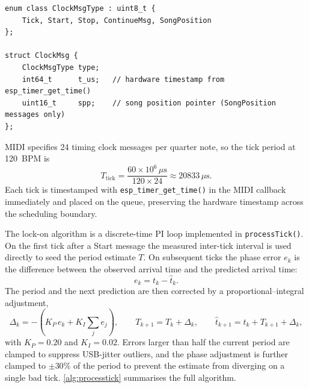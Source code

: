 \begin{listing}[H]
	\begin{verbatim}
enum class ClockMsgType : uint8_t {
    Tick, Start, Stop, ContinueMsg, SongPosition
};

struct ClockMsg {
    ClockMsgType type;
    int64_t      t_us;   // hardware timestamp from esp_timer_get_time()
    uint16_t     spp;    // song position pointer (SongPosition messages only)
};
\end{verbatim}
	\caption{\texttt{ClockMsg} type definitions from \texttt{clock\_sync.h}.}
	\label{lst:clockmsg}
\end{listing}

MIDI specifies 24 timing clock messages per quarter note, so the tick period at 120~BPM is
\begin{equation}
	T_\text{tick} = \frac{60 \times 10^6\,\mu\text{s}}{120 \times 24} \approx 20833\,\mu\text{s}.
\end{equation}
Each tick is timestamped with \texttt{esp\_timer\_get\_time()} in the MIDI callback immediately
and placed on the queue, preserving the hardware timestamp across the scheduling boundary.

The lock-on algorithm is a discrete-time PI loop implemented in \texttt{processTick()}.
On the first tick after a Start message the measured inter-tick interval is used directly
to seed the period estimate $T$.
On subsequent ticks the phase error $e_k$ is the difference between the observed arrival time
and the predicted arrival time:
\begin{equation}
	e_k = t_k - \hat{t}_k .
\end{equation}
The period and the next prediction are then corrected by a proportional--integral adjustment,
\begin{equation}
	\Delta_k = -\!\left(K_P \, e_k + K_I \textstyle\sum_j e_j\right), \qquad
	T_{k+1} = T_k + \Delta_k, \qquad
	\hat{t}_{k+1} = t_k + T_{k+1} + \Delta_k,
\end{equation}
with $K_P = 0.20$ and $K_I = 0.02$.
Errors larger than half the current period are clamped to suppress USB-jitter outliers,
and the phase adjustment is further clamped to $\pm 30\%$ of the period to prevent
the estimate from diverging on a single bad tick.
\autoref{alg:processtick} summarises the full algorithm.

